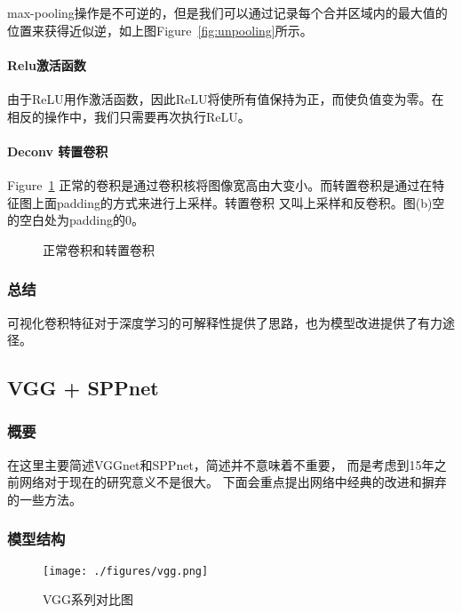 \documentclass{article}
\newcommand{\tao}[1]{\todo[color=red!20,size=\footnotesize]{T: #1}{}}
\begin{document}
\begin{CJK}{UTF8}{gbsn}
max-pooling操作是不可逆的，但是我们可以通过记录每个合并区域内的最大值的位置来获得近似逆，如上图Figure~\ref{fig:unpooling}所示。 

\paragraph{Relu激活函数}
由于ReLU用作激活函数，因此ReLU将使所有值保持为正，而使负值变为零。在相反的操作中，我们只需要再次执行ReLU。

\paragraph{Deconv 转置卷积} Figure~\ref{fig:deconv}
正常的卷积是通过卷积核将图像宽高由大变小。而转置卷积是通过在特征图上面padding的方式来进行上采样。转置卷积
又叫上采样和反卷积。图(b)空的空白处为padding的0。 

\begin{figure}[!ht]
    \centering
    \hfill
    \caption{正常卷积和转置卷积}
    \label{fig:deconv}
\end{figure}



\subsubsection{总结}
可视化卷积特征对于深度学习的可解释性提供了思路，也为模型改进提供了有力途径。


\subsection{VGG + SPPnet}
\subsubsection{概要}
在这里主要简述VGGnet和SPPnet，简述并不意味着不重要，
而是考虑到15年之前网络对于现在的研究意义不是很大。
下面会重点提出网络中经典的改进和摒弃的一些方法。


\subsubsection{模型结构}
\begin{figure}[!h]
    \centering
    \texttt{[image: ./figures/vgg.png]}
    \caption{VGG系列对比图}
    \label{fig:vgg}
\end{figure}



\end{CJK}
\end{document}
